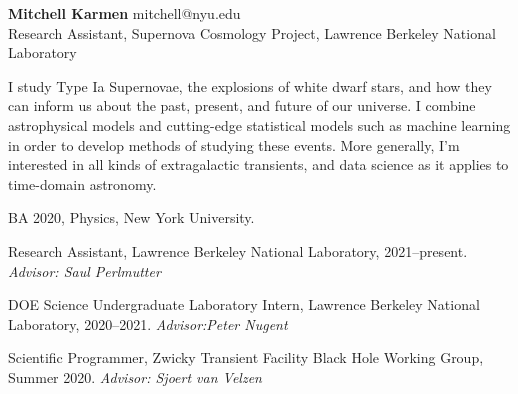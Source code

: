 \documentclass[12pt,letterpaper]{article}
\begin{document}
\thispagestyle{empty}\sloppy\sloppypar\raggedbottom

\textbf{\Large Mitchell Karmen} \hfill
\textsf{\small mitchell@nyu.edu} \\[0.5ex] %
Research Assistant, Supernova Cosmology Project, Lawrence Berkeley National Laboratory\\[0.5ex]

\medskip

I study Type Ia Supernovae, the explosions of white dwarf stars, and how they can inform us about the past, present, and future of our universe.  I combine astrophysical models and cutting-edge statistical models such as machine learning in order to develop methods of studying these events.  More generally, I'm interested in all kinds of extragalactic transients, and data science as it applies to time-domain astronomy.


\begin{list}{}{\cvlist}


  \item
        BA 2020, Physics, New York University.


\end{list}

\begin{list}{}{\cvlist}


  \item
        Research Assistant, Lawrence Berkeley National Laboratory, 2021--present. \textit{Advisor: Saul Perlmutter}

  \item
        DOE Science Undergraduate Laboratory Intern, Lawrence Berkeley National Laboratory, 2020--2021. \textit{Advisor:Peter Nugent}

  \item
        Scientific Programmer, Zwicky Transient Facility Black Hole Working Group, Summer 2020. \textit{Advisor: Sjoert van Velzen}


\end{list}
\end{document}
